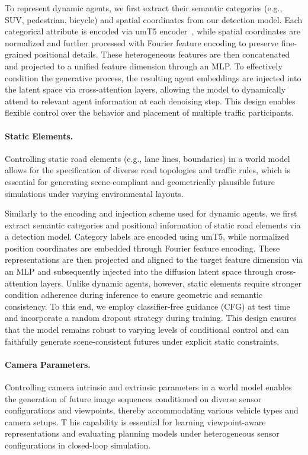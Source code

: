 To represent dynamic agents, we first extract their semantic categories (e.g., SUV, pedestrian, bicycle) and spatial coordinates from our detection model. 
Each categorical attribute is encoded via umT5 encoder~\cite{chung2023unimax}, while spatial coordinates are normalized and further processed with Fourier feature encoding to preserve fine-grained positional details. 
These heterogeneous features are then concatenated and projected to a unified feature dimension through an MLP. 
To effectively condition the generative process, the resulting agent embeddings are injected into the latent space via cross-attention layers, allowing the model to dynamically attend to relevant agent information at each denoising step. 
This design enables flexible control over the behavior and placement of multiple traffic participants.


\paragraph{Static Elements.}
Controlling static road elements (e.g., lane lines, boundaries) in a world model allows for the specification of diverse road topologies and traffic rules, which is essential for generating scene-compliant and geometrically plausible future simulations under varying environmental layouts. 

Similarly to the encoding and injection scheme used for dynamic agents, we first extract semantic categories and positional information of static road elements via a detection model. 
Category labels are encoded using umT5, while normalized position coordinates are embedded through Fourier feature encoding. 
These representations are then projected and aligned to the target feature dimension via an MLP and subsequently injected into the diffusion latent space through cross-attention layers. 
Unlike dynamic agents, however, static elements require stronger condition adherence during inference to ensure geometric and semantic consistency. 
To this end, we employ classifier-free guidance (CFG) at test time and incorporate a random dropout strategy during training. 
This design ensures that the model remains robust to varying levels of conditional control and can faithfully generate scene-consistent futures under explicit static constraints. 


\paragraph{Camera Parameters.}
Controlling camera intrinsic and extrinsic parameters in a world model enables the generation of future image sequences conditioned on diverse sensor configurations and viewpoints, thereby accommodating various vehicle types and camera setups. T
his capability is essential for learning viewpoint-aware representations and evaluating planning models under heterogeneous sensor configurations in closed-loop simulation. 

